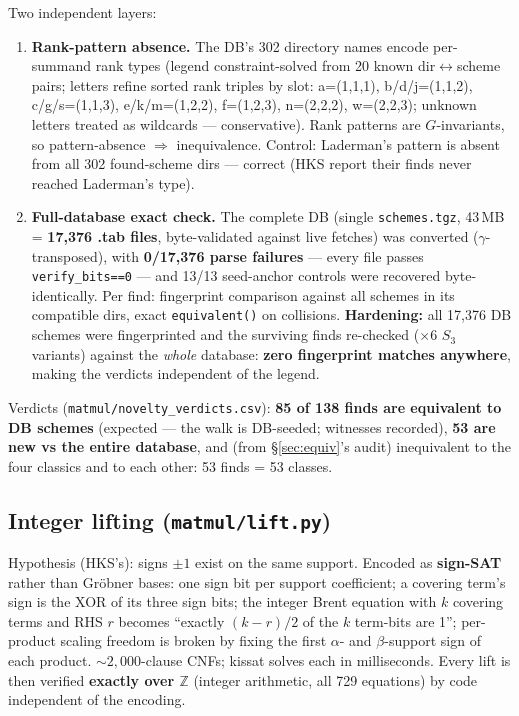 \documentclass[10pt]{article}
\begin{document}
Two independent layers:

\begin{enumerate}
\item \textbf{Rank-pattern absence.} The DB's 302 directory names
  encode per-summand rank types (legend constraint-solved from 20
  known dir$\leftrightarrow$scheme pairs; letters refine sorted rank
  triples by slot: a=(1,1,1), b/d/j=(1,1,2), c/g/s=(1,1,3),
  e/k/m=(1,2,2), f=(1,2,3), n=(2,2,2), w=(2,2,3); unknown letters
  treated as wildcards --- conservative). Rank patterns are
  $G$-invariants, so pattern-absence $\Rightarrow$ inequivalence.
  Control: Laderman's pattern is absent from all 302 found-scheme dirs
  --- correct (HKS report their finds never reached Laderman's type).
\item \textbf{Full-database exact check.} The complete DB (single
  \texttt{schemes.tgz}, 43\,MB = \textbf{17{,}376 .tab files},
  byte-validated against live fetches) was converted
  ($\gamma$-transposed), with \textbf{0/17{,}376 parse failures} ---
  every file passes \texttt{verify\_bits==0} --- and 13/13 seed-anchor
  controls were recovered byte-identically. Per find: fingerprint
  comparison against all schemes in its compatible dirs, exact
  \texttt{equivalent()} on collisions. \textbf{Hardening:} all
  17{,}376 DB schemes were fingerprinted and the surviving finds
  re-checked ($\times 6$ $S_3$ variants) against the \emph{whole}
  database: \textbf{zero fingerprint matches anywhere}, making the
  verdicts independent of the legend.
\end{enumerate}

Verdicts (\texttt{matmul/novelty\_verdicts.csv}): \textbf{85 of 138
finds are equivalent to DB schemes} (expected --- the walk is
DB-seeded; witnesses recorded), \textbf{53 are new vs the entire
database}, and (from \S\ref{sec:equiv}'s audit) inequivalent to the
four classics and to each other: 53 finds = 53 classes.

\subsection{Integer lifting (\texttt{matmul/lift.py})}\label{sec:lift}

Hypothesis (HKS's): signs $\pm 1$ exist on the same support. Encoded
as \textbf{sign-SAT} rather than Gr\"obner bases: one sign bit per
support coefficient; a covering term's sign is the XOR of its three
sign bits; the integer Brent equation with $k$ covering terms and RHS
$r$ becomes ``exactly $(k-r)/2$ of the $k$ term-bits are 1'';
per-product scaling freedom is broken by fixing the first $\alpha$-
and $\beta$-support sign of each product. ${\sim}2{,}000$-clause CNFs;
kissat solves each in milliseconds. Every lift is then verified
\textbf{exactly over $\mathbb{Z}$} (integer arithmetic, all 729
equations) by code independent of the encoding.
\end{document}
